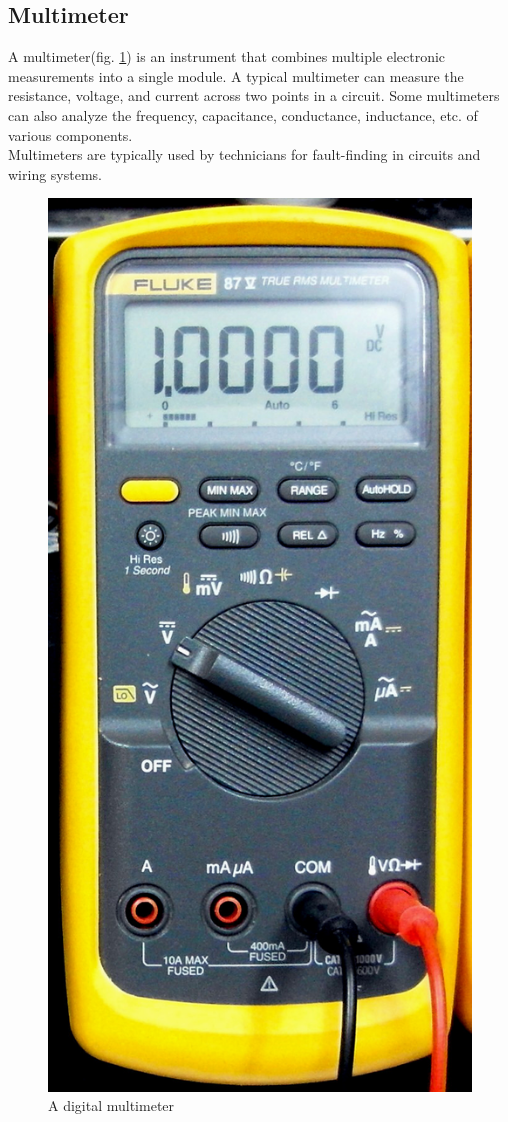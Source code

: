 \documentclass{article}
\begin{document}
\subsection{Multimeter}
A multimeter(fig. \ref{fig:multimeter}) is an instrument that combines multiple electronic measurements into a single module. A typical multimeter can measure the resistance, voltage, and current across two points in a circuit. Some multimeters can also analyze the frequency, capacitance, conductance, inductance, etc. of various components.\\
Multimeters are typically used by technicians for fault-finding in circuits and wiring systems.
\begin{figure}[h]
	\centering
	\includegraphics[height=0.7\linewidth]{Fluke87-V_Multimeter}
	\caption{A digital multimeter}
	\label{fig:multimeter}
\end{figure}
\end{document}
